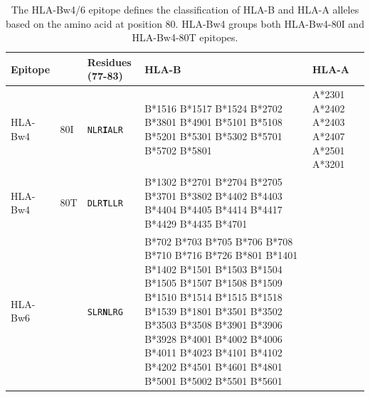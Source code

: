 \documentclass[12pt,a4paper,twoside]{article}
\begin{document}
\begin{table} [h]
\begin{center}
\footnotesize
\begin{tabularx} {\linewidth} {l l l X X}
\toprule
Epitope & & Residues (77-83) & HLA-B & HLA-A \\
\midrule
HLA-Bw4 & 80I & {\tt{NLR{\bf{I}}ALR}} & B*1516 B*1517 B*1524 B*2702 B*3801 B*4901 B*5101 B*5108 B*5201 B*5301 B*5302 B*5701 B*5702 B*5801 & A*2301 A*2402 A*2403 A*2407 A*2501 A*3201 \\
\midrule
HLA-Bw4 & 80T & {\tt{DLR{\bf{T}}LLR}} & B*1302 B*2701 B*2704 B*2705 B*3701 B*3802 B*4402 B*4403 B*4404 B*4405 B*4414 B*4417 B*4429 B*4435 B*4701 & \\
\midrule
HLA-Bw6 &  & {\tt{SLR{\bf{N}}LRG}} & B*702 B*703 B*705 B*706 B*708 B*710 B*716 B*726 B*801 B*1401 B*1402 B*1501 B*1503 B*1504 B*1505 B*1507 B*1508 B*1509 B*1510 B*1514 B*1515 B*1518 B*1539 B*1801 B*3501 B*3502 B*3503 B*3508 B*3901 B*3906 B*3928 B*4001 B*4002 B*4006 B*4011 B*4023 B*4101 B*4102 B*4202 B*4501 B*4601 B*4801 B*5001 B*5002 B*5501 B*5601 & \\
\end{tabularx}
\end{center}
    \caption{
        The \citet{Martin:2002el} HLA-Bw4/6 epitope defines the classification of HLA-B and HLA-A alleles based on the amino acid at position 80.
        HLA-Bw4 groups both HLA-Bw4-80I and HLA-Bw4-80T epitopes.
    }
    \label{table:HLA-epitope}
\end{table}
\end{document}
